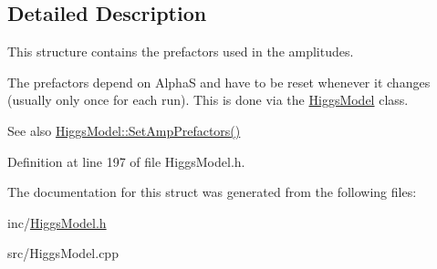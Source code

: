 \subsection{Detailed Description}
This structure contains the prefactors used in the amplitudes. 

The prefactors depend on Alpha\+S and have to be reset whenever it changes (usually only once for each run). This is done via the \hyperlink{classHiggsModel}{Higgs\+Model} class. \begin{DoxySeeAlso}{See also}
\hyperlink{classHiggsModel_a514e3dd7854409c622b8e200fe2ee84c}{Higgs\+Model\+::\+Set\+Amp\+Prefactors()} 
\end{DoxySeeAlso}


Definition at line 197 of file Higgs\+Model.\+h.



The documentation for this struct was generated from the following files\+:\begin{DoxyCompactItemize}
\item 
inc/\hyperlink{HiggsModel_8h}{Higgs\+Model.\+h}\item 
src/Higgs\+Model.\+cpp\end{DoxyCompactItemize}
